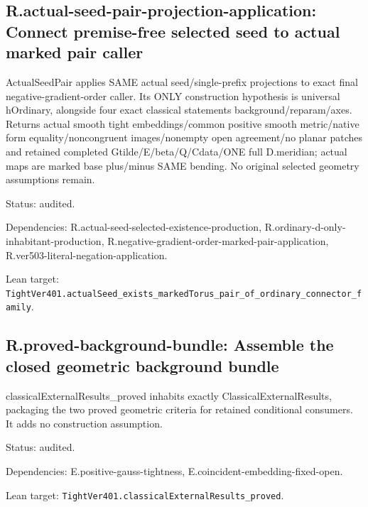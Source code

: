 \documentclass{article}
\begin{document}
\subsection*{R.actual-seed-pair-projection-application: Connect premise-free selected seed to actual marked pair caller}
ActualSeedPair applies SAME actual seed/single-prefix projections to exact final negative-gradient-order caller. Its ONLY construction hypothesis is universal hOrdinary, alongside four exact classical statements background/reparam/axes. Returns actual smooth tight embeddings/common positive smooth metric/native form equality/noncongruent images/nonempty open agreement/no planar patches and retained completed Gtilde/E/beta/Q/Cdata/ONE full D.meridian; actual maps are marked base plus/minus SAME bending. No original selected geometry assumptions remain.
\par Status: audited.
\par Dependencies: R.actual-seed-selected-existence-production, R.ordinary-d-only-inhabitant-production, R.negative-gradient-order-marked-pair-application, R.ver503-literal-negation-application.
\par Lean target: \texttt{TightVer401.actualSeed\_exists\_markedTorus\_pair\_of\_ordinary\_connector\_family}.
\subsection*{R.proved-background-bundle: Assemble the closed geometric background bundle}
classicalExternalResults\_proved inhabits exactly ClassicalExternalResults, packaging the two proved geometric criteria for retained conditional consumers. It adds no construction assumption.
\par Status: audited.
\par Dependencies: E.positive-gauss-tightness, E.coincident-embedding-fixed-open.
\par Lean target: \texttt{TightVer401.classicalExternalResults\_proved}.
\end{document}
